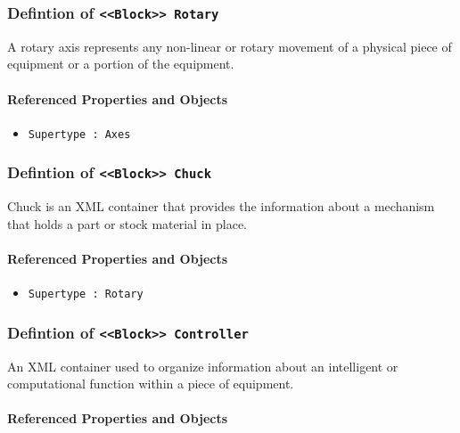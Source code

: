 \subsubsection{Defintion of \texttt{<<Block>> Rotary}}
  \label{type:Rotary}

\FloatBarrier

A rotary axis represents any non-linear or rotary movement of a physical piece of equipment or a portion of the equipment.

\FloatBarrier
\paragraph{Referenced Properties and Objects}

\begin{itemize}
\item \texttt{Supertype : Axes}

\end{itemize}
\FloatBarrier
\subsubsection{Defintion of \texttt{<<Block>> Chuck}}
  \label{type:Chuck}

\FloatBarrier

Chuck is an XML container that provides the information about a mechanism that holds a part or stock material in place.

\FloatBarrier
\paragraph{Referenced Properties and Objects}

\begin{itemize}
\item \texttt{Supertype : Rotary}

\end{itemize}
\FloatBarrier
\subsubsection{Defintion of \texttt{<<Block>> Controller}}
  \label{type:Controller}

\FloatBarrier

An XML container used to organize information about an intelligent or computational function within a piece of equipment.

\FloatBarrier
\paragraph{Referenced Properties and Objects}

